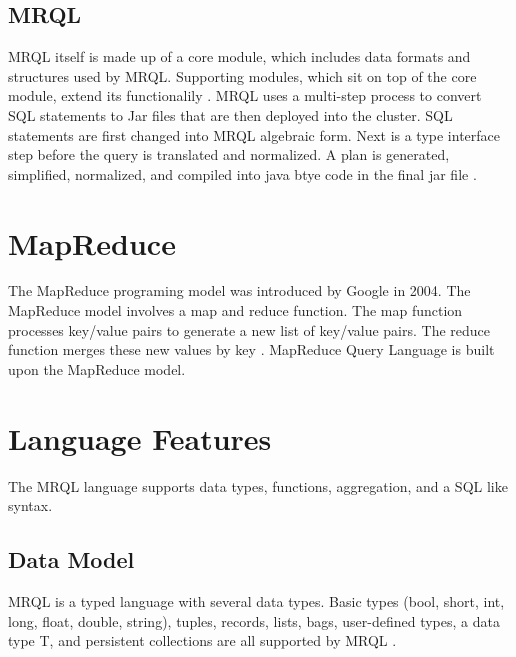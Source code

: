 \documentclass[9pt,twocolumn,twoside]{../../styles/osajnl}
\begin{document}

\subsection{MRQL}

MRQL itself is made up of a core module, which includes data formats and structures used by MRQL.  Supporting modules, which sit on top of the core module, extend its functionalily \cite{mrqlthesis}.  MRQL uses a multi-step process to convert SQL statements to Jar files that are then deployed into the cluster.  SQL statements are first changed into MRQL algebraic form.  Next is a type interface step before the query is translated and normalized.  A plan is generated, simplified, normalized, and compiled into java btye code in the final jar file \cite{mrqlthesis}.


\section{MapReduce}

The MapReduce programing model was introduced by Google in 2004.  The MapReduce model involves a map and reduce function.  The map function processes key/value pairs to generate a new list of key/value pairs.  The reduce function merges these new values by key \cite{googlemapreduce}.  MapReduce Query Language is built upon the MapReduce model.  


\section{Language Features}

The MRQL language supports data types, functions, aggregation, and a SQL like syntax.

\subsection{Data Model}

MRQL is a typed language with several data types.  Basic types (bool, short, int, long, float, double, string), tuples, records, lists, bags, user-defined types, a data type T, and persistent collections are all supported by MRQL \cite{www-wikilanguage}. 
\end{document}
